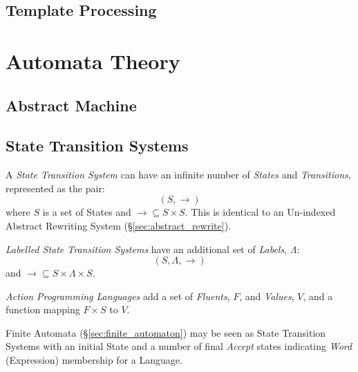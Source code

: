 \subsection{Template Processing}\label{sec:template_processing}



\section{Automata Theory}\label{sec:automata_theory}


\subsection{Abstract Machine} \label{sec:abstract_machine}

\subsection{State Transition Systems} \label{sec:state_transition_system}

A \emph{State Transition System} can have an infinite number of
\emph{States} and \emph{Transitions}, represented as the pair:
\[
  (S,\rightarrow)
\]
where $S$ is a set of States and $\rightarrow \subseteq S \times S$.
This is identical to an Un-indexed Abstract Rewriting System
(\S\ref{sec:abstract_rewrite}).

\emph{Labelled State Transition Systems} have an additional set of
\emph{Labels}, $\Lambda$:
\[
  (S,\Lambda,\rightarrow)
\]
and $\rightarrow \subseteq S \times \Lambda \times S$.

\emph{Action Programming Languages} add a set of \emph{Fluents}, $F$, and
\emph{Values}, $V$, and a function mapping $F \times S$ to $V$.

Finite Automata (\S\ref{sec:finite_automaton}) may be seen as State
Transition Systems with an initial State and a number of final
\emph{Accept} states indicating \emph{Word} (Expression) membership
for a Language.



